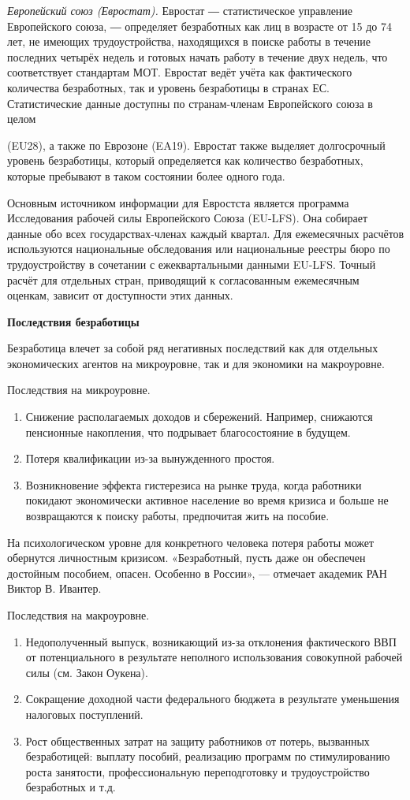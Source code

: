 \textit{Европейский союз (Евростат).}
Евростат ― статистическое управление Европейского союза, ― определяет безработных как лиц в возрасте от 15 до 74 лет, не имеющих трудоустройства, находящихся в поиске работы в течение последних четырёх недель и готовых начать работу в течение двух недель, что соответствует стандартам МОТ. Евростат ведёт учёта как фактического количества безработных, так и уровень безработицы в странах ЕС. Статистические данные доступны по странам-членам Европейского союза в целом

(EU28), а также по Еврозоне (EA19). Евростат также выделяет долгосрочный уровень безработицы, который определяется как количество безработных, которые пребывают в таком состоянии более одного года.

Основным источником информации для Евростста является программа Исследования рабочей силы Европейского Союза (EU-LFS). Она собирает данные обо всех государствах-членах каждый квартал. Для ежемесячных расчётов используются национальные обследования или национальные реестры бюро по трудоустройству в сочетании с ежеквартальными данными EU-LFS. Точный расчёт для отдельных стран, приводящий к согласованным ежемесячным оценкам, зависит от доступности этих данных.

\textbf{Последствия безработицы}

Безработица влечет за собой ряд негативных последствий как для отдельных экономических агентов на микроуровне, так и для экономики на макроуровне.

Последствия на микроуровне.
\begin{enumerate}
    \item Снижение располагаемых доходов и сбережений. Например, снижаются пенсионные накопления, что подрывает благосостояние в будущем.
    \item Потеря квалификации из-за вынужденного простоя.
    \item Возникновение эффекта гистерезиса на рынке труда, когда работники покидают экономически активное население во время кризиса и больше не возвращаются к поиску работы, предпочитая жить на пособие.
\end{enumerate}
На психологическом уровне для конкретного человека потеря работы может обернутся личностным кризисом. «Безработный, пусть даже он обеспечен достойным пособием, опасен. Особенно в России», — отмечает академик РАН Виктор В. Ивантер.

Последствия на макроуровне.
\begin{enumerate}
    \item Недополученный выпуск, возникающий из-за отклонения фактического ВВП от потенциального в результате неполного использования совокупной рабочей силы (см. Закон Оукена).
    \item Сокращение доходной части федерального бюджета в результате уменьшения налоговых поступлений.
    \item Рост общественных затрат на защиту работников от потерь, вызванных безработицей: выплату пособий, реализацию программ по стимулированию роста занятости, профессиональную переподготовку и трудоустройство безработных и т.д.
\end{enumerate}